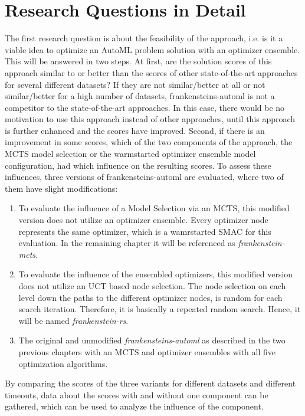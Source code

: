 \section{Research Questions in Detail}
The first research question is about the feasibility of the approach, i.e. is it a viable idea to optimize an AutoML problem solution with an optimizer ensemble.
This will be answered in two steps.\newline
At first, are the solution scores of this approach similar to or better than the scores of other state-of-the-art approaches for several different datasets?
If they are not similar/better at all or not similar/better for a high number of datasets, frankensteins-automl is not a competitor to the state-of-the-art approaches.
In this case, there would be no motivation to use this approach instead of other approaches, until this approach is further enhanced and the scores have improved.\newline
Second, if there is an improvement in some scores, which of the two components of the approach, the MCTS model selection or the warmstarted optimizer ensemble model configuration, had which influence on the resulting scores.
To assess these influences, three versions of frankensteins-automl are evaluated, where two of them have slight modifications:
\begin{enumerate}
    \item To evaluate the influence of a Model Selection via an MCTS, this modified version does not utilize an optimizer ensemble.
    Every optimizer node represents the same optimizer, which is a wamrstarted SMAC for this evaluation.
    In the remaining chapter it will be referenced as \textit{frankenstein-mcts.}
    \item To evaluate the influence of the ensembled optimizers, this modified version does not utilize an UCT based node selection.
    The node selection on each level down the paths to the different optimizer nodes, is random for each search iteration.
    Therefore, it is basically a repeated random search.
    Hence, it will be named \textit{frankenstein-rs}.
    \item The original and unmodified \textit{frankensteins-automl} as described in the two previous chapters with an MCTS and optimizer ensembles with all five optimization algorithms.
\end{enumerate}
By comparing the scores of the three variants for different datasets and different timeouts, data about the scores with and without one component can be gathered, which can be used to analyze the influence of the component.

